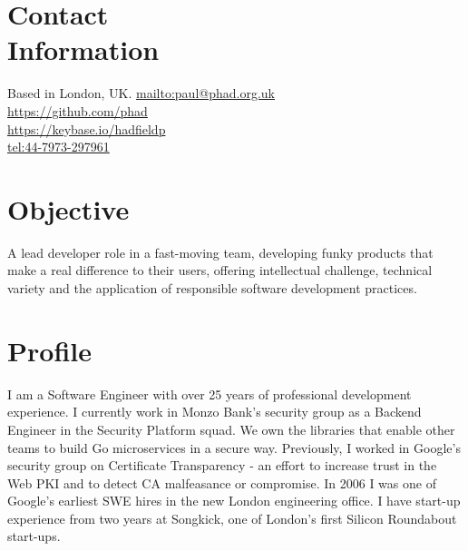 \documentclass[line]{resume}
\begin{document}
\begin{resume}

    \section{\mysidestyle Contact\\Information}

    Based in London, UK.                   \hfill \url{mailto:paul@phad.org.uk}            \vspace{0mm}\\\vspace{0mm}%
                                           \hfill \url{https://github.com/phad}            \vspace{0mm}\\\vspace{0mm}%
                                           \hfill \url{https://keybase.io/hadfieldp}       \vspace{0mm}\\\vspace{0mm}%
                                           \hfill \url{tel:44-7973-297961}                 \vspace{0mm}\\\vspace{-4.5mm}%

    \section{\mysidestyle Objective}

    A lead developer role in a fast-moving team, developing funky products that make a real difference to their users,
    offering intellectual challenge, technical variety and the application of responsible software development
    practices.

    \section{\mysidestyle Profile}

    I am a Software Engineer with over 25 years of professional development experience.  I currently work in Monzo
    Bank's security group as a Backend Engineer in the Security Platform squad.  We own the libraries that enable other
    teams to build Go microservices in a secure way.  Previously, I worked in Google's security group on Certificate
    Transparency - an effort to increase trust in the Web PKI and to detect CA malfeasance or compromise.  In 2006 I
    was one of Google's earliest SWE hires in the new London engineering office.  I have start-up experience from two
    years at Songkick, one of London's first Silicon Roundabout start-ups.


\end{resume}
\end{document}
